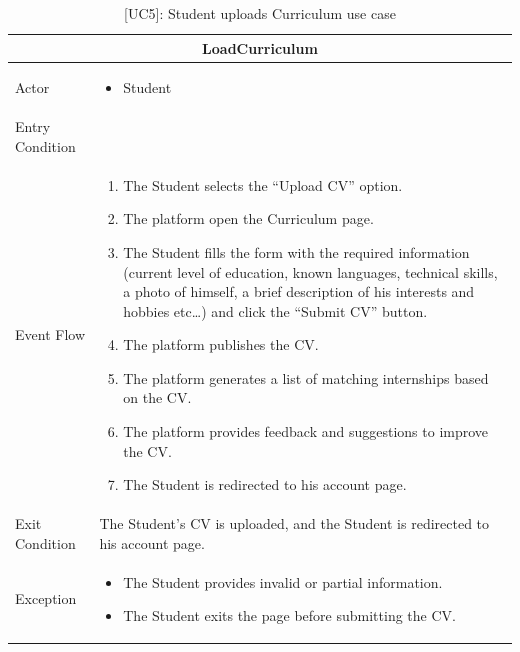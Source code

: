 \begin{table}[H]
    \centering
    \begin{tabular}{|p{3cm}|p{12cm}|}
    \hline
    \multicolumn{2}{|c|}{\textbf{LoadCurriculum}} \\ \hline
    Actor & 
    \begin{itemize}
        \item Student
    \end{itemize}\\ \hline
    Entry Condition & \\ \hline
    Event Flow &
    \begin{enumerate}         
        \item The Student selects the “Upload CV” option.
        \item The platform open the Curriculum page.
        \item The Student fills the form with the required information (current level of education, known languages, technical skills, a photo of himself, a brief description of his interests and hobbies etc…) and click the “Submit CV” button.
        \item The platform publishes the CV.
        \item The platform generates a list of matching internships based on the CV.
        \item The platform provides feedback and suggestions to improve the CV.
        \item The Student is redirected to his account page.
    \end{enumerate} \\ \hline
    Exit Condition & The Student's CV is uploaded, and the Student is redirected to his account page. \\ \hline
    Exception & 
    \begin{itemize} 
        \item The Student provides invalid or partial information.
        \item The Student exits the page before submitting the CV.
    \end{itemize} \\ \hline
    \end{tabular}
    \caption{[UC5]: Student uploads Curriculum use case}
    \label{tab:UC5}
\end{table}

